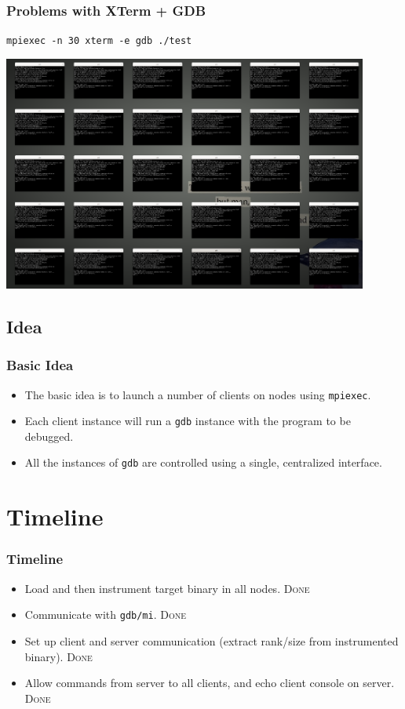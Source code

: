 \documentclass{beamer}
\begin{document}
\begin{frame}
  \frametitle{Problems with XTerm + GDB}
  \texttt{mpiexec -n 30 xterm -e gdb ./test}

  \begin{center}
    \includegraphics[width=0.9\textwidth]{usingxterm}
  \end{center}
\end{frame}


\subsection{Idea}
\begin{frame}
  \frametitle{Basic Idea}
\begin{itemize}
  \item <1-> The basic idea is to launch a number of clients on nodes using \texttt{mpiexec}.
  \item <2-> Each client instance will run a \texttt{gdb} instance with the program to be debugged.
  \item <3-> All the instances of \texttt{gdb} are controlled using a single, centralized interface.
\end{itemize}
\end{frame}

\section{Timeline}
\begin{frame}
  \frametitle{Timeline}
  \begin{itemize}
  \item <1-> Load and then instrument target binary in all nodes. \textsc{Done}
  \item <2-> Communicate with \texttt{gdb/mi}. \textsc{Done}
  \item <3-> Set up client and server communication (extract rank/size from instrumented binary). \textsc{Done}
  \item <4-> Allow commands from server to all clients, and echo client console on server. \textsc{Done}
  \end{itemize}
\end{frame}
\end{document}
